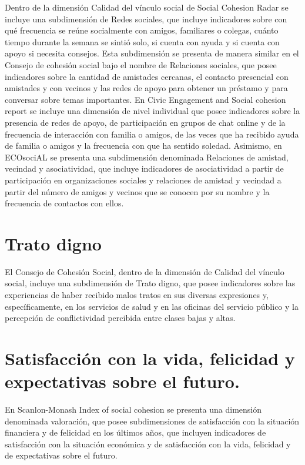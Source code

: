 \documentclass[
  12pt,
]{book}
\begin{document}
Dentro de la dimensión Calidad del vínculo social de Social Cohesion Radar se incluye una subdimensión de Redes sociales, que incluye indicadores sobre con qué frecuencia se reúne socialmente con amigos, familiares o colegas, cuánto tiempo durante la semana se sintió solo, si cuenta con ayuda y si cuenta con apoyo si necesita consejos. Esta subdimensión se presenta de manera similar en el Consejo de cohesión social bajo el nombre de Relaciones sociales, que posee indicadores sobre la cantidad de amistades cercanas, el contacto presencial con amistades y con vecinos y las redes de apoyo para obtener un préstamo y para conversar sobre temas importantes. En Civic Engagement and Social cohesion report se incluye una dimensión de nivel individual que posee indicadores sobre la presencia de redes de apoyo, de participación en grupos de chat online y de la frecuencia de interacción con familia o amigos, de las veces que ha recibido ayuda de familia o amigos y la frecuencia con que ha sentido soledad. Asimismo, en ECOsociAL se presenta una subdimensión denominada Relaciones de amistad, vecindad y asociatividad, que incluye indicadores de asociatividad a partir de participación en organizaciones sociales y relaciones de amistad y vecindad a partir del número de amigos y vecinos que se conocen por su nombre y la frecuencia de contactos con ellos.

\hypertarget{trato-digno}{%
\section{Trato digno}\label{trato-digno}}

El Consejo de Cohesión Social, dentro de la dimensión de Calidad del vínculo social, incluye una subdimensión de Trato digno, que posee indicadores sobre las experiencias de haber recibido malos tratos en sus diversas expresiones y, específicamente, en los servicios de salud y en las oficinas del servicio público y la percepción de conflictividad percibida entre clases bajas y altas.

\hypertarget{satisfacciuxf3n-con-la-vida-felicidad-y-expectativas-sobre-el-futuro.}{%
\section{Satisfacción con la vida, felicidad y expectativas sobre el futuro.}\label{satisfacciuxf3n-con-la-vida-felicidad-y-expectativas-sobre-el-futuro.}}

En Scanlon-Monash Index of social cohesion se presenta una dimensión denominada valoración, que posee subdimensiones de satisfacción con la situación financiera y de felicidad en los últimos años, que incluyen indicadores de satisfacción con la situación económica y de satisfacción con la vida, felicidad y de expectativas sobre el futuro.
\end{document}

